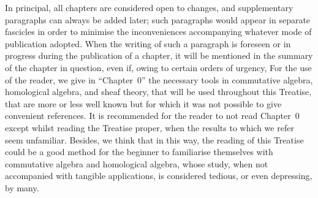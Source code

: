 \documentclass[10pt,oneside]{book}
\begin{document}
\bigskip

In principal, all chapters are considered open to changes, and supplementary
paragraphs can always be added later; such paragraphs would appear in separate
fascicles in order to minimise the inconveniences accompanying whatever mode of
publication adopted. When the writing of such a paragraph is foreseen or in
progress during the publication of a chapter, it will be mentioned in the
summary of the chapter in question, even if, owing to certain orders of urgency,
 For the use of
the reader, we give in ``Chapter~0'' the necessary tools in commutative algebra,
homological algebra, and sheaf theory, that will be used throughout this
Treatise, that are more or less well known but for which it was not possible to
give convenient references. It is recommended for the reader to not read
Chapter~0 except whilst reading the Treatise proper, when the results to which
we refer
seem unfamiliar. Besides, we think that in this way, the
reading of this Treatise could be a good method for the beginner to familiarise
themselves with commutative algebra and homological algebra, whose study, when
not accompanied with tangible applications, is considered tedious, or even
depressing, by many.

\asttri
\end{document}
